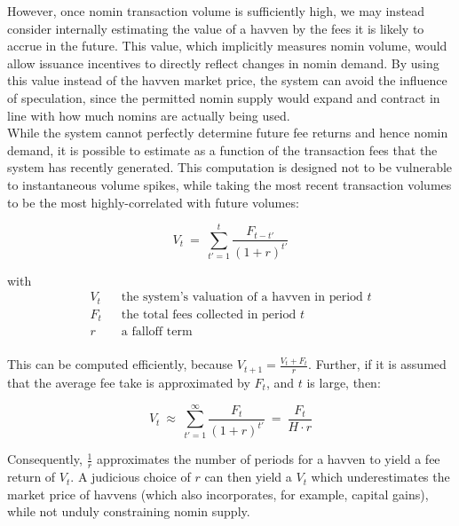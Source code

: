 \noindent However, once nomin transaction volume is sufficiently high, we may instead consider internally estimating
the value of a havven by the fees it is likely to accrue in the future. This value, which implicitly measures nomin volume,
would allow issuance incentives to directly reflect changes in nomin demand.
By using this value instead of the havven market price, the system can avoid the influence of speculation,
since the permitted nomin supply would expand and contract in line with how much nomins are actually being used. \\

\noindent While the system cannot perfectly determine future fee returns and hence nomin demand, it is possible to estimate as a
function of the transaction fees that the system has recently generated.
This computation is designed not to be vulnerable to instantaneous volume spikes, while taking the most recent transaction
volumes to be the most highly-correlated with future volumes:

\vspace{3mm}

\begin{equation}
    V_{t} \ = \ \sum_{t'=1}^{t} \frac{F_{t - t'}}{(1 + r)^{t'}} \label{eq:price}
\end{equation}

with
\begin{align*} 
V_{t} \ \ & \text{ the system's valuation of a havven in period } t  \\
F_t \ \ & \text{ the total fees collected in period } t\\
r \ \ & \text{ a falloff term}  \\
\end{align*}

\noindent This can be computed efficiently, because $V_{t+1} = \frac{V_t + F_t}{r}$. 
Further, if it is assumed that the average fee take is approximated by $F_t$, and $t$ is large, then:

\vspace{2mm}

\begin{equation}
    V_t \ \approx \ \sum_{t'=1}^{\infty} \frac{F_t}{(1 + r)^{t'}} \ = \ \frac{F_t}{H \cdot r}
\end{equation}

\vspace{3mm}

\noindent Consequently, $\frac{1}{r}$ approximates the number of periods for a havven to yield a fee return of $V_t$.
A judicious choice of $r$ can then yield a $V_t$ which underestimates the market price of havvens (which also incorporates,
for example, capital gains), while not unduly constraining nomin supply.

